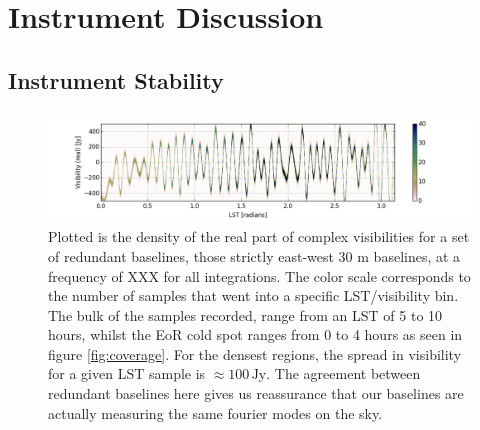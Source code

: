 \documentclass[twocolumn,numberedappendix]{emulateapj} \shorttitle{PSA64}
\begin{document}
%



\section{Instrument Discussion}\label{sec:instrument}
\subsection{Instrument Stability}

\begin{figure}[!t]
\centering
\includegraphics[width=2.3\columnwidth]{plots/density.png}
\caption{Plotted is the density of the real part of
complex visibilities for a set of redundant baselines, those strictly
east-west 30 m baselines, at a frequency of XXX for all integrations. The
color scale corresponds to the number of samples that went into a specific
LST/visibility bin. The bulk of the samples recorded, range from an LST of 5 to
10 hours, whilst the EoR cold spot ranges from 0 to 4 hours as seen in figure
\ref{fig:coverage}. For the densest regions, the spread in visibility for a
given LST sample is $\approx{100} \,\text{Jy}$. The agreement between redundant
baselines here gives us reassurance that our baselines are actually measuring
the same fourier modes on the sky.}
\label{fig:density}
\end{figure}
\end{document}
